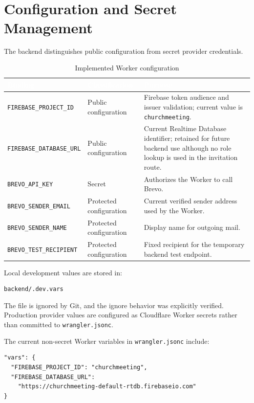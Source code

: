 \documentclass[11pt,a4paper,oneside]{report}
\begin{document}
\section{Configuration and Secret Management}

The backend distinguishes public configuration from secret provider credentials.

\begin{table}[H]
\centering
{}
\begin{tabularx}{\linewidth}{@{}l l X@{}}
\toprule
\rowcolor{primary}
\textcolor{white}{\textbf{Binding}} & \textcolor{white}{\textbf{Classification}} & \textcolor{white}{\textbf{Purpose}} \\
\midrule
\texttt{FIREBASE\_PROJECT\_ID} & Public configuration & Firebase token audience and issuer validation; current value is \texttt{churchmeeting}. \\
\texttt{FIREBASE\_DATABASE\_URL} & Public configuration & Current Realtime Database identifier; retained for future backend use although no role lookup is used in the invitation route. \\
\texttt{BREVO\_API\_KEY} & Secret & Authorizes the Worker to call Brevo. \\
\texttt{BREVO\_SENDER\_EMAIL} & Protected configuration & Current verified sender address used by the Worker. \\
\texttt{BREVO\_SENDER\_NAME} & Protected configuration & Display name for outgoing mail. \\
\texttt{BREVO\_TEST\_RECIPIENT} & Protected configuration & Fixed recipient for the temporary backend test endpoint. \\
\bottomrule
\end{tabularx}
\caption{Implemented Worker configuration}
\end{table}

Local development values are stored in:

\begin{lstlisting}
backend/.dev.vars
\end{lstlisting}

The file is ignored by Git, and the ignore behavior was explicitly verified. Production provider values are configured as Cloudflare Worker secrets rather than committed to \texttt{wrangler.jsonc}.

The current non-secret Worker variables in \texttt{wrangler.jsonc} include:

\begin{lstlisting}
"vars": {
  "FIREBASE_PROJECT_ID": "churchmeeting",
  "FIREBASE_DATABASE_URL":
    "https://churchmeeting-default-rtdb.firebaseio.com"
}
\end{lstlisting}
\end{document}
